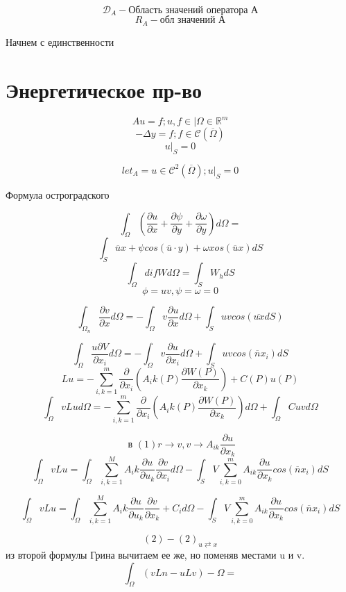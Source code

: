 \documentclass{article}
\begin{document}
\[ \mathcal{D}_A - \textrm{Область значений оператора А} \]
\[ R_A - \textrm{обл значений А} \] 

Начнем с единственности

\section{Энергетическое пр-во}

\[ Au=f; u,f \in | \Omega \in \mathbb{R}^m \]
\[ -\Delta y = f; f \in \mathcal{C}(\overline{\Omega}) \]
\[ u|_S = 0 \]

\[ let_A = {u \in \mathcal{C }^2 (\overline{\Omega}); u|_S = 0} \]

Формула остроградского

\[ \int_{\Omega}^{}(\frac{\partial u}{\partial x } + \frac{\partial \psi }{\partial y} + \frac{\partial \omega}{\partial y}) d\Omega = \]
\[ \int_{S }^{} \overline{u }x + \psi cos(\overline{u }\cdot y) + \omega xos (\overline{u }x ) dS\]
\[  \]
\[ \int_{\Omega}^{} dif W d\Omega = \int_{S}^{} W_h dS \]
\[ \phi = uv, \psi = \omega = 0 \]

\[ \int_{{\Omega}_n}^{} \frac{\partial v }{\partial x } d \Omega = - \int_{\Omega}^{} v \frac{\partial u }{\partial x } d \Omega + \int_{S}^{} uv cos (\overline{u x } dS) \]

\[ \int_{\Omega }^{} \frac{u \partial V }{\partial x_i} d \Omega = - \int_{\Omega }^{} v \frac{\partial u}{\partial x_i} d \Omega + \int_{S }^{} uv cos(\overline{n }x_i ) dS\]
\[ Lu = - \sum_{i,k =1}^{m } \frac{\partial }{\partial x_i} (A_ik (P ) \frac{ \partial W(P)}{\partial x_k}) + C(P) u(P) \]
\[ \int_{\Omega}^{} v Lu d \Omega = - \sum_{i,k =1}^{m } \frac{\partial }{\partial x_i} (A_ik (P ) \frac{ \partial W(P)}{\partial x_k}) d \Omega + \int_{\Omega}^{}C u v d \Omega  \]

\[ \textrm{ в } (1) r \rightarrow v, v \rightarrow A_{ik} \frac{\partial u }{\partial x_k } \]
\[ \int_{\Omega}^{} v L u  = \int_{\Omega}^{} \sum_{i,k = 1}^{M }A_ik \frac{\partial u }{\partial u_k} \frac{\partial v }{\partial x_i} d\Omega - \int_{S }^{} V \sum_{i,k =0}^{m} A_{ik} \frac{\partial u}{\partial x_k } cos(\overline{n }x_i ) dS\]

\[ \int_{\Omega}^{} v L u  = \int_{\Omega}^{} \sum_{i,k = 1}^{M }A_ik \frac{\partial u }{\partial u_k} \frac{\partial v }{\partial x_k} + C_i d\Omega - \int_{S }^{} V \sum_{i,k =0}^{m} A_{ik} \frac{\partial u}{\partial x_k } cos(\overline{n }x_i ) dS\]

\[ (2) - (2)_{u \rightleftarrows x} \]
из второй формулы Грина вычитаем ее же, но поменяв местами u и v.
\[ \int_{\Omega}^{} (vLn - u Lv) - \Omega =\]
\end{document}
